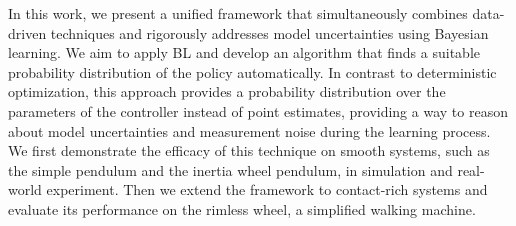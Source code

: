 In this work, we present a unified framework that simultaneously combines
data-driven techniques and rigorously addresses model uncertainties using Bayesian
learning.
%
We aim to apply BL and develop an algorithm that finds a suitable probability
distribution of the policy automatically.
%
In contrast to deterministic optimization, this approach provides a probability
distribution over the parameters of the controller instead of point
estimates, providing a way to reason about model uncertainties and measurement
noise during the learning process.
%
We first demonstrate the efficacy of this technique on smooth systems, such as
the simple pendulum and the inertia wheel pendulum, in simulation and real-world
experiment.
%
Then we extend the framework to contact-rich systems and evaluate its
performance on the rimless wheel, a simplified walking machine.
